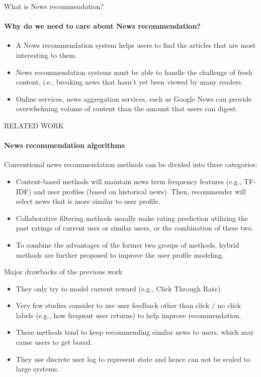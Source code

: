 \begin{frame}{What is News recommendation?}
\framesubtitle{Why do we need to care about News recommendation?}
\begin{itemize}
    \item  A News recommendation system helps users to find the articles that are most interesting to them.
    \item News recommendation systems must be able to handle the challenge of fresh content, i.e., breaking news that hasn’t yet been viewed by many readers.
    \item Online services, news aggregation services, such as Google News can provide overwhelming volume of content than the amount that users can digest.
\end{itemize}
\end{frame}



\begin{frame}{RELATED WORK}
  \framesubtitle{News recommendation algorithms}
  Conventional news recommendation methods can be divided into three categories:
  \begin{itemize}
      \item Content-based methods will maintain news term frequency features (e.g., TF-IDF) and user profiles (based on historical news). Then, recommender will select news that is more similar to user profile.
      \item Collaborative filtering methods usually make rating prediction utilizing the past ratings of current user or similar users, or the combination of these two.
      \item To combine the advantages of the former two groups of methods, hybrid methods are further proposed to improve the user profile modeling.
  \end{itemize}
 
\end{frame}


\begin{frame}{Major drawbacks of the previous work}
   \begin{itemize}
       \item They only try to model current reward (e.g., Click Through Rate).
       \item Very few studies consider to use user feedback other than click / no click labels (e.g., how frequent user returns) to help improve recommendation.
       \item These methods tend to keep recommending similar news to users, which may cause users to get bored.
       \item They use discrete user log to represent state and hence can not be scaled to large systems.
\end{itemize}
\end{frame}

